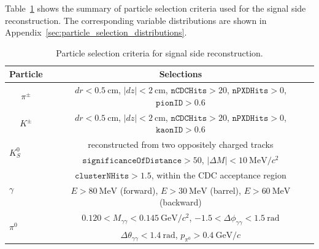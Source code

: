 Table~\ref{tab:particle_selection} shows the summary of particle selection criteria used for the signal side reconstruction.
The corresponding variable distributions are shown in Appendix~\ref{sec:particle_selection_distributions}.
\begin{table}[h]
\caption{Particle selection criteria for signal side reconstruction.}
    \centering
    \begin{tabular}{ p{1.5cm} p{9cm} }
    \hline
    \hline
    \multicolumn{1}{c}{Particle} & \multicolumn{1}{c}{Selections} \\
    \hline
    \multicolumn{1}{c}{$\pi^{\pm}$} & \multicolumn{1}{c}{$dr < 0.5~\textrm{cm}$, $\left| dz \right| < 2~\textrm{cm}$, $\texttt{nCDCHits} > 20$, $\texttt{nPXDHits} > 0$, $\texttt{pionID} > 0.6$} \\
    \hline
    \multicolumn{1}{c}{$K^{\pm}$} & \multicolumn{1}{c}{$dr < 0.5~\textrm{cm}$, $\left| dz \right| < 2~\textrm{cm}$, $\texttt{nCDCHits} > 20$, $\texttt{nPXDHits} > 0$, $\texttt{kaonID} > 0.6$} \\
    \hline
    \multirow{2}{1.5cm}{\centering $K_{S}^{0}$} & \multicolumn{1}{c}{reconstructed from two oppositely charged tracks} \\
    & \multicolumn{1}{c}{$\texttt{significanceOfDistance} > 50$, $|\Delta M| < 10~\textrm{MeV}/c^{2}$}\\
    \hline
    \multirow{2}{1.5cm}{\centering $\gamma$} & \multicolumn{1}{c}{$\texttt{clusterNHits} > 1.5$, within the CDC acceptance region} \\
    & \multicolumn{1}{c}{$E > 80~\textrm{MeV}$ (forward), $E > 30~\textrm{MeV}$ (barrel), $E > 60~\textrm{MeV}$ (backward)}\\
    \hline
    \multirow{2}{1.5cm}{\centering $\pi^{0}$} & \multicolumn{1}{c}{$0.120 < M_{\gamma \gamma} < 0.145~\textrm{GeV}/c^{2}$, $-1.5<\Delta \phi_{\gamma \gamma} < 1.5~\textrm{rad}$} \\
    & \multicolumn{1}{c}{$\Delta\theta_{\gamma \gamma}<1.4~\textrm{rad}$, $p_{\pi^{0}} > 0.4~\textrm{GeV}/c$}\\
  \hline
  \hline
\end{tabular}
    \label{tab:particle_selection}
\end{table}

